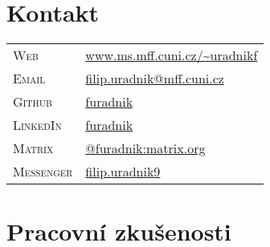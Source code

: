 \documentclass[a4paper, oneside, final]{scrartcl} %
\newcommand{\splitspace}{3.39cm}
\begin{document}
\begin{center} %


	{\fontsize{36}{36}\selectfont\scshape{}} %

	\vspace{1.5cm} %


	\section{Kontakt}

	\begin{tabularx}{0.97\linewidth}{>{\raggedleft\scshape}p{\splitspace}X}
		Web       & \href{https://www.ms.mff.cuni.cz/~uradnikf}{www.ms.mff.cuni.cz/\textasciitilde{}uradnikf} \\
		Email     & \href{mailto:filip.uradnik@mff.cuni.cz}{filip.uradnik@mff.cuni.cz}                        \\
		Github    & \href{https://github.com/furadnik}{furadnik}                                              \\
		LinkedIn  & \href{https://www.linkedin.com/in/furadnik/}{furadnik}                                    \\
		Matrix    & \href{https://matrix.to/\#/@furadnik:matrix.org}{@furadnik:matrix.org}                    \\
		Messenger & \href{https://m.me/filip.uradnik9}{filip.uradnik9}                                        \\
	\end{tabularx}


	\section{Pracovní zkušenosti}


\end{center}
\end{document}
